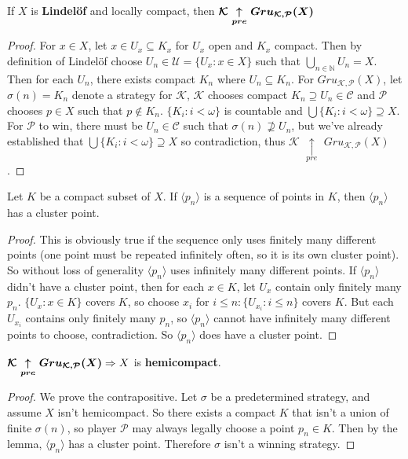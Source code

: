 \documentclass{article}
\begin{document}
	\begin{theorem}
		If $X$ is \textbf{Lindel\"of} and locally compact, then $\boldsymbol{\mathcal{K}$ $\underset{pre}{\uparrow}$ $Gru_{\mathcal{K}, \mathcal{P}} (X)}$
	\end{theorem}
	\begin{proof}
		For $x \in X$, let $x \in U_x \subseteq K_x$ for $U_x$ open and $K_x$ compact. Then by definition of Lindel\"of choose $U_n \in \mathcal{U} = \lbrace U_x : x \in X \rbrace$ such that $\underset{n \in \mathbb{N}}{\bigcup}U_n = X$. Then for each $U_n$, there exists compact $K_n$ where $U_n \subseteq K_n$. \newline
		For $Gru_{\mathcal{K}, \mathcal{P}} (X)$, let $\sigma(n) = K_n$ denote a strategy for $\mathcal{K}$, $\mathcal{K}$ chooses compact $K_n \supseteq U_n \in \mathcal{C}$ and $\mathcal{P}$ chooses $p \in X$ such that $p \not\in K_n$. $\lbrace K_i : i < \omega \rbrace$ is countable and $\bigcup \lbrace K_i : i < \omega \rbrace \supseteq X$. For $\mathcal{P}$ to win, there must be $U_n \in \mathcal{C}$ such that $\sigma(n) \not\supseteq U_n$, but we've already established that $\bigcup \lbrace K_i : i < \omega \rbrace \supseteq X$ so contradiction, thus $\mathcal{K}$ $\underset{pre}{\uparrow}$ $Gru_{\mathcal{K}, \mathcal{P}} (X)$.
	\end{proof}

	\begin{lemma}
	Let $K$ be a compact subset of $X$. If $\langle p_n \rangle$ is a sequence of points in $K$, then $\langle p_n \rangle$ has a cluster point.
	\end{lemma}
	\begin{proof}
	This is obviously true if the sequence only uses finitely many different points (one point must be repeated infinitely often, so it is its own cluster point). So without loss of generality $\langle p_n \rangle$ uses infinitely many different points. If $\langle p_n \rangle$ didn't have a cluster point, then for each $x \in K$, let $U_x$ contain only finitely many $p_n$. $\lbrace U_x : x \in K \rbrace$ covers $K$, so choose $x_i$ for $i \leq n : \lbrace U_{x_i} : i \leq n \rbrace$ covers $K$. But each $U_{x_i}$ contains only finitely many $p_n$, so $\langle p_n \rangle$ cannot have infinitely many different points to choose, contradiction. So $\langle p_n \rangle$ does have a cluster point.
	\end{proof}

	\begin{theorem}
		$\boldsymbol{\mathcal{K}$ $\underset{pre}{\uparrow}$ $Gru_{\mathcal{K}, \mathcal{P}} (X)} \Rightarrow X$ is \textbf{hemicompact}.
	\end{theorem}
	\begin{proof}
		We prove the contrapositive. Let $\sigma$ be a predetermined strategy, and assume $X$ isn't hemicompact. So there exists a compact $K$ that isn't a union of finite $\sigma(n)$, so player $\mathcal{P}$ may always legally choose a point $p_n \in K$. Then by the lemma, $\langle p_n \rangle$ has a cluster point. Therefore $\sigma$ isn't a winning strategy.
	\end{proof}
\end{document}

